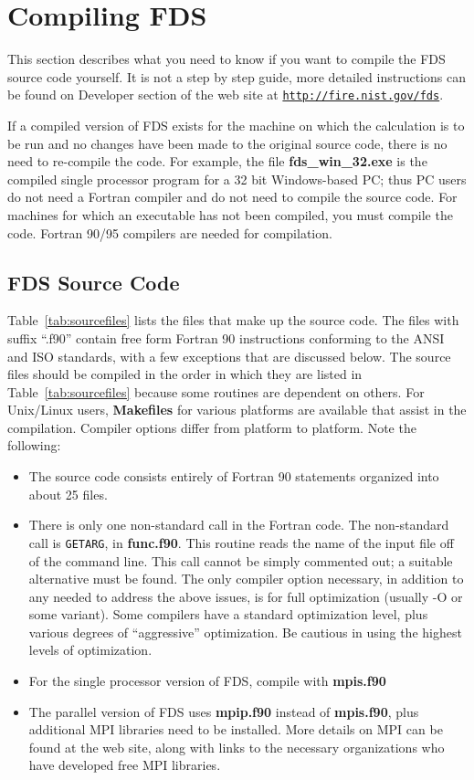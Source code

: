 \documentclass[11pt]{book}
\newcommand{\ct}{\tt\small}
\begin{document}
\chapter{Compiling FDS}
\label{info:compilation}

This section describes what you need to know if you want to compile the FDS source code yourself.
It is not a step by step guide, more detailed instructions can be found on Developer section of the web site at \href{http://fire.nist.gov/fds}{{\ct http://fire.nist.gov/fds}}.

If a compiled version of FDS exists for the machine on which the
calculation is to be run and no changes have been made to
the original source code, there is no need to re-compile the code.
For example, the file {\bf fds\_win\_32.exe} is the
compiled single processor program for a 32 bit Windows-based PC;
thus PC users do not need a
Fortran compiler and do not need to compile the source code.
For machines for which an executable has not been compiled, you must
compile the code. Fortran 90/95 compilers are needed for compilation.

\section{FDS Source Code}

Table~\ref{tab:sourcefiles} lists the files that make up the source code.
The files with suffix ``.f90'' contain free form Fortran 90 instructions
conforming to the ANSI and ISO standards, with a few exceptions that are discussed below.
The source files should be compiled in the order in which they are listed
in Table~\ref{tab:sourcefiles} because some routines are dependent on others.
For Unix/Linux users, {\bf Makefiles} for various platforms are available
that assist in the compilation. Compiler options differ from platform to platform.
Note the following:
\begin{itemize}
\item The source code consists entirely of Fortran 90
statements organized into about 25 files.
\item There is only one non-standard call in the Fortran code. The non-standard call is {\ct GETARG},
in {\bf func.f90}. This routine reads the name of the input file off of the command line. This call cannot
be simply commented out; a suitable alternative must be found.
The only compiler option necessary, in addition to any needed to
address the above issues, is for full optimization (usually -O or some variant). Some
compilers have a standard optimization level, plus various degrees of
``aggressive'' optimization. Be cautious in using the highest levels of optimization.
\item For the single processor version of FDS, compile with {\bf mpis.f90}
\item The parallel version of FDS uses {\bf mpip.f90} instead of
{\bf mpis.f90}, plus additional MPI libraries need to be installed. More
details on MPI can be found at the web site, along with links to the
necessary organizations who have developed free MPI libraries.
\end{itemize}
\end{document}
